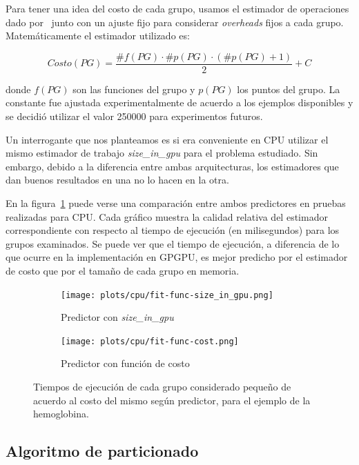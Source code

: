 Para tener una idea del costo de cada grupo, usamos el estimador de operaciones
dado por~\cite{LIO} junto con un ajuste fijo para considerar \textit{overheads} fijos a
cada grupo. Matem\'aticamente el estimador utilizado es:

\begin{equation}
    Costo(PG) = \frac{\#f(PG) \cdot \#p(PG) \cdot (\#p(PG) + 1)}{2} + C
\end{equation}

donde $f(PG)$ son las funciones del grupo y $p(PG)$ los puntos del grupo. La
constante fue ajustada experimentalmente de acuerdo a los ejemplos disponibles y
se decidi\'o utilizar el valor 250000 para experimentos futuros.

Un interrogante que nos planteamos es si era conveniente en CPU utilizar el mismo
estimador de trabajo \textit{size\_in\_gpu} para el problema estudiado. Sin
embargo, debido a la diferencia entre ambas arquitecturas, los estimadores que
dan buenos resultados en una no lo hacen en la otra.

En la figura~\ref{fig:comp-size-cost} puede verse una comparaci\'on entre ambos
predictores en pruebas realizadas para CPU. Cada gr\'afico muestra la calidad
relativa del estimador correspondiente con respecto al tiempo de ejecuci\'on
(en milisegundos) para los grupos examinados. Se puede ver que el tiempo de
ejecuci\'on, a diferencia de lo que ocurre en la implementaci\'on en GPGPU, es
mejor predicho por el estimador de costo que por el tama\~no de cada grupo en
memoria.

\begin{figure}[htbp]
   \centering
   \begin{subfigure}[b]{\plotwidthtres}
     \texttt{[image: plots/cpu/fit-func-size\_in\_gpu.png]}
     \caption{Predictor con \textit{size\_in\_gpu}}
   \end{subfigure}
   \begin{subfigure}[b]{\plotwidthtres}
     \texttt{[image: plots/cpu/fit-func-cost.png]}
     \caption{Predictor con funci\'on de costo}
   \end{subfigure}
   \caption{Tiempos de ejecuci\'on de cada grupo considerado peque\~no de acuerdo
    al costo del mismo seg\'un predictor, para el ejemplo de la hemoglobina.}
   \label{fig:comp-size-cost}
\end{figure}

\subsection{Algoritmo de particionado}

